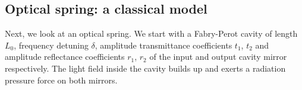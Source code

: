 


\subsection{Optical spring: a classical model}
Next, we look at an optical spring.
We start with a Fabry-Perot  cavity of length 
$L_0$, frequency detuning $\delta$, amplitude transmittance coefficients $t_1$, $t_2$  and amplitude reflectance coefficients $r_1$, $r_2$ of the input and output cavity mirror respectively. 
The light field inside the cavity builds up and exerts a radiation pressure force on both mirrors.


